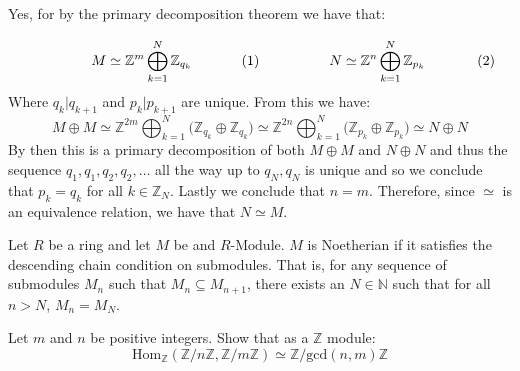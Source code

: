 \documentclass[crop=false,class=article]{standalone}                           %
\begin{document}
        \begin{solution}
            Yes, for by the primary decomposition theorem we have that:
            \par
            \begin{subequations}
                \begin{minipage}[b]{0.49\textwidth}
                    \begin{equation}
                        M\simeq\mathbb{Z}^{m}
                        \bigoplus_{k=1}^{N}\mathbb{Z}_{q_{k}}
                    \end{equation}
                \end{minipage}
                \hfill
                \begin{minipage}[b]{0.49\textwidth}
                    \begin{equation}
                        N\simeq\mathbb{Z}^{n}
                        \bigoplus_{k=1}^{N}\mathbb{Z}_{p_{k}}
                    \end{equation}
                \end{minipage}
            \end{subequations}
            Where $q_{k}|q_{k+1}$ and $p_{k}|p_{k+1}$ are unique. From this we
            have:
            \begin{equation}
                M\oplus{M}\simeq
                \mathbb{Z}^{2m}\bigoplus_{k=1}^{N}
                \Big(\mathbb{Z}_{q_{k}}\oplus\mathbb{Z}_{q_{k}}\Big)
                \simeq
                \mathbb{Z}^{2n}\bigoplus_{k=1}^{N}
                \Big(\mathbb{Z}_{p_{k}}\oplus\mathbb{Z}_{p_{k}}\Big)
                \simeq{N}\oplus{N}
            \end{equation}
            By then this is a primary decomposition of both $M\oplus{M}$ and
            $N\oplus{N}$ and thus the sequence $q_{1},q_{1},q_{2},q_{2},\dots$
            all the way up to $q_{N},q_{N}$ is unique and so we conclude that
            $p_{k}=q_{k}$ for all $k\in\mathbb{Z}_{N}$. Lastly we conclude that
            $n=m$. Therefore, since $\simeq$ is an equivalence relation, we have
            that $N\simeq{M}$.
        \end{solution}
        \begin{problem}
            Let $R$ be a ring and let $M$ be and $R\textrm{-Module}$. $M$ is
            Noetherian if it satisfies the descending chain condition on
            submodules. That is, for any sequence of submodules $M_{n}$ such
            that $M_{n}\subseteq{M}_{n+1}$, there exists an $N\in\mathbb{N}$
            such that for all $n>N$, $M_{n}=M_{N}$.
        \end{problem}
        \begin{problem}
            Let $m$ and $n$ be positive integers. Show that as a $\mathbb{Z}$
            module:
            \begin{equation}
                \textrm{Hom}_{\mathbb{Z}}(\mathbb{Z}/n\mathbb{Z},
                                          \mathbb{Z}/m\mathbb{Z})
                \simeq\mathbb{Z}/\textrm{gcd}(n,m)\mathbb{Z}
            \end{equation}
        \end{problem}
\end{document}
